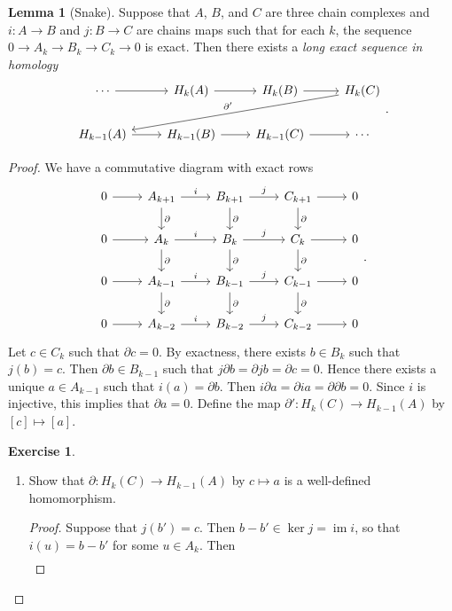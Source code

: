 \documentclass[10pt,letterpaper,cm]{nupset}
\theoremstyle{definition}
\theoremstyle{theorem}
\newtheorem{lemma}[definition]{Lemma}
\newtheorem{exercise}[definition]{Exercise}
\theoremstyle{remark}
\newcommand{\1}{\mathbb{1}}
\newcommand{\0}{\vec 0}
\DeclareMathOperator{\im}{im}
\begin{document}
\begin{lemma}[Snake]
Suppose that $A$, $B$, and $C$ are three chain complexes and $i: A \to B$ and $j: B \to C$ are chains maps such that for each $k$, the sequence $0 \to A_k \to B_k \to C_k \to 0$ is exact. Then there exists a \textit{long exact sequence in homology}
\[
\begin{tikzcd}
\cdots \arrow[r] & H_k(A) \arrow[r]     & H_k(B) \arrow[r]     & H_k(C) \arrow[llld, "\partial '"'] \\
                  H_{k-1}(A) \arrow[r] & H_{k-1}(B) \arrow[r] & H_{k-1}(C) \arrow[r] & \cdots                              
\end{tikzcd}
.\]
\end{lemma}
\begin{proof}
We have a commutative diagram with exact rows
\[
\begin{tikzcd}
0 \arrow[r] & A_{k+1} \arrow[r, "i"] \arrow[d, "\partial"]     & B_{k+1} \arrow[r, "j"] \arrow[d, "\partial"]     & C_{k+1} \arrow[r] \arrow[d, "\partial"]     & 0 \\
0 \arrow[r] & A_k \arrow[r, "i"] \arrow[d, "\partial"]     & B_k \arrow[r, "j"] \arrow[d, "\partial"]     & C_k \arrow[r] \arrow[d, "\partial"]     & 0 \\
0 \arrow[r] & A_{k-1} \arrow[r, "i"] \arrow[d, "\partial"] & B_{k-1} \arrow[r, "j"] \arrow[d, "\partial"] & C_{k-1} \arrow[r] \arrow[d, "\partial"] & 0 \\
0 \arrow[r] & A_{k-2} \arrow[r, "i"]                       & B_{k-2} \arrow[r, "j"]                       & C_{k-2} \arrow[r]                       & 0
\end{tikzcd}
.\]
Let $c\in C_k$ such that $\partial{c} = 0$. By exactness, there exists $b\in B_k$ such that $j(b)=c$. Then $\partial{b} \in B_{k-1}$ such that $j\partial{b}=\partial{j}b=\partial{c}=0$. Hence there exists a unique $a\in A_{k-1}$ such that $i(a) = \partial{b}$. Then $i \partial{a} = \partial{ia} =\partial{\partial{b}} = 0$. Since $i$ is injective, this implies that $\partial{a} =0$. Define the map $\partial ' : H_k(C) \to H_{k-1}(A)$ by $[c]\mapsto [a]$.
\begin{exercise} $ $
\begin{enumerate}
\item Show that $\partial : H_k(C) \to H_{k-1}(A)$ by $c\mapsto a$ is a well-defined homomorphism. 
\begin{proof} Suppose that $j(b') = c$. Then $b -b' \in \ker{j} = \im{i}$, so that $i(u) = b-b'$ for some $u \in A_k$. Then 
\begin{align*}

\end{align*}
\end{proof}
\end{enumerate}
\end{exercise}
\end{proof}
\end{document}
